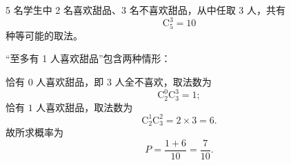 \begin{answer}

5 名学生中 2 名喜欢甜品、3 名不喜欢甜品，从中任取 3 人，共有
\nopagebreak[4]
\[\mathrm C_5^3=10\]
种等可能的取法。

“至多有 1 人喜欢甜品”包含两种情形：

恰有 $0$ 人喜欢甜品，即 3 人全不喜欢，取法数为
\nopagebreak[4]
\[\mathrm C_2^0\mathrm C_3^3=1;\]
恰有 $1$ 人喜欢甜品，取法数为
\nopagebreak[4]
\[\mathrm C_2^1\mathrm C_3^2=2\times3=6.\]
故所求概率为
\nopagebreak[4]
\[P=\frac{1+6}{10}=\frac7{10}.\]



\end{answer}
